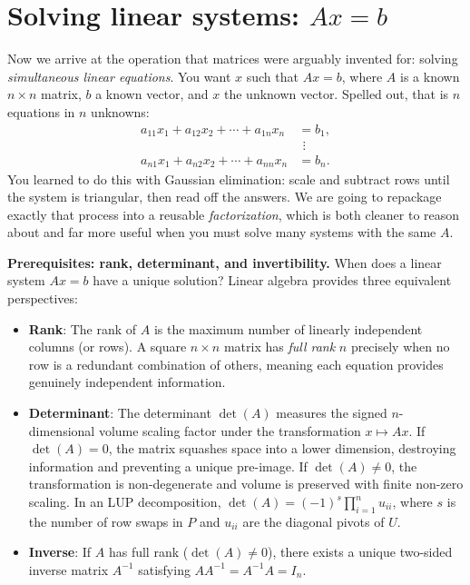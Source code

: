 \section{Solving linear systems: $Ax=b$}

Now we arrive at the operation that matrices were arguably invented for: solving
\emph{simultaneous linear equations}. You want $x$ such that $Ax=b$, where $A$ is
a known $n\times n$ matrix, $b$ a known vector, and $x$ the unknown vector. Spelled
out, that is $n$ equations in $n$ unknowns:
$$
\begin{aligned}
a_{11}x_1+a_{12}x_2+\cdots+a_{1n}x_n&=b_1,\\
&\ \,\vdots\\
a_{n1}x_1+a_{n2}x_2+\cdots+a_{nn}x_n&=b_n.
\end{aligned}
$$
You learned to do this with Gaussian elimination: scale and subtract rows until
the system is triangular, then read off the answers. We are going to repackage
exactly that process into a reusable \emph{factorization}, which is both cleaner
to reason about and far more useful when you must solve many systems with the same
$A$.

\begin{intuitionbox}
\textbf{Prerequisites: rank, determinant, and invertibility.}
When does a linear system $Ax=b$ have a unique solution? Linear algebra provides three equivalent perspectives:
\begin{itemize}
  \item \textbf{Rank}: The rank of $A$ is the maximum number of linearly independent columns (or rows). A square $n \times n$ matrix has \emph{full rank} $n$ precisely when no row is a redundant combination of others, meaning each equation provides genuinely independent information.
  \item \textbf{Determinant}: The determinant $\det(A)$ measures the signed $n$-dimensional volume scaling factor under the transformation $x \mapsto Ax$. If $\det(A) = 0$, the matrix squashes space into a lower dimension, destroying information and preventing a unique pre-image. If $\det(A) \ne 0$, the transformation is non-degenerate and volume is preserved with finite non-zero scaling. In an LUP decomposition, $\det(A) = (-1)^s \prod_{i=1}^n u_{ii}$, where $s$ is the number of row swaps in $P$ and $u_{ii}$ are the diagonal pivots of $U$.
  \item \textbf{Inverse}: If $A$ has full rank ($\det(A) \ne 0$), there exists a unique two-sided inverse matrix $A^{-1}$ satisfying $A A^{-1} = A^{-1} A = I_n$.
\end{itemize}
\end{intuitionbox}

